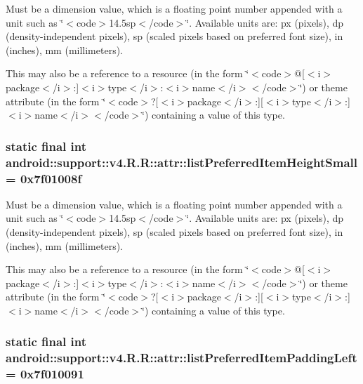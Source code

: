 Must be a dimension value, which is a floating point number appended with a unit such as \char`\"{}$<$code$>$14.5sp$<$/code$>$\char`\"{}. Available units are: px (pixels), dp (density-independent pixels), sp (scaled pixels based on preferred font size), in (inches), mm (millimeters). 

This may also be a reference to a resource (in the form \char`\"{}$<$code$>$@\mbox{[}$<$i$>$package$<$/i$>$:\mbox{]}$<$i$>$type$<$/i$>$:$<$i$>$name$<$/i$>$$<$/code$>$\char`\"{}) or theme attribute (in the form \char`\"{}$<$code$>$?\mbox{[}$<$i$>$package$<$/i$>$:\mbox{]}\mbox{[}$<$i$>$type$<$/i$>$:\mbox{]}$<$i$>$name$<$/i$>$$<$/code$>$\char`\"{}) containing a value of this type. \hypertarget{classandroid_1_1support_1_1v4_1_1_r_1_1attr_7ddc9d4a0378de729755aa3f8bb15da7}{
\subsubsection[{listPreferredItemHeightSmall}]{\setlength{\rightskip}{0pt plus 5cm}static final int android::support::v4.R.R::attr::listPreferredItemHeightSmall = 0x7f01008f}}
\label{classandroid_1_1support_1_1v4_1_1_r_1_1attr_7ddc9d4a0378de729755aa3f8bb15da7}


Must be a dimension value, which is a floating point number appended with a unit such as \char`\"{}$<$code$>$14.5sp$<$/code$>$\char`\"{}. Available units are: px (pixels), dp (density-independent pixels), sp (scaled pixels based on preferred font size), in (inches), mm (millimeters). 

This may also be a reference to a resource (in the form \char`\"{}$<$code$>$@\mbox{[}$<$i$>$package$<$/i$>$:\mbox{]}$<$i$>$type$<$/i$>$:$<$i$>$name$<$/i$>$$<$/code$>$\char`\"{}) or theme attribute (in the form \char`\"{}$<$code$>$?\mbox{[}$<$i$>$package$<$/i$>$:\mbox{]}\mbox{[}$<$i$>$type$<$/i$>$:\mbox{]}$<$i$>$name$<$/i$>$$<$/code$>$\char`\"{}) containing a value of this type. \hypertarget{classandroid_1_1support_1_1v4_1_1_r_1_1attr_72223050bdb40020ff830ae1dbfee036}{
\subsubsection[{listPreferredItemPaddingLeft}]{\setlength{\rightskip}{0pt plus 5cm}static final int android::support::v4.R.R::attr::listPreferredItemPaddingLeft = 0x7f010091}}
\label{classandroid_1_1support_1_1v4_1_1_r_1_1attr_72223050bdb40020ff830ae1dbfee036}


